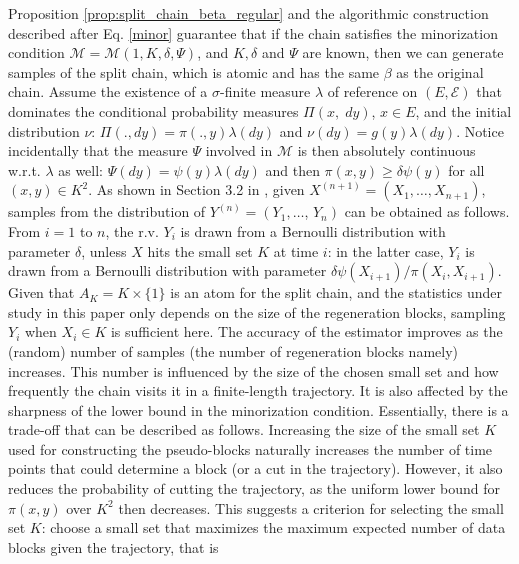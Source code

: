 \documentclass[sn-mathphys-ay]{sn-jnl}%
\newcommand{\smallSet}{K}
\begin{document}
\begin{appendices}
Proposition \ref{prop:split_chain_beta_regular} and the algorithmic construction
described after Eq. \eqref{minor} guarantee that if the chain satisfies the
minorization condition $\mathcal{M}=\mathcal{M}(1,K,\delta,\Psi)$, and $K,\delta$ and
$\Psi$ are known, then we can generate samples of the split chain, which is atomic
and has the same $\beta$ as the original chain. Assume the existence of a
$\sigma$-finite measure $\lambda$ of reference on $(E,\mathcal{E})$ that dominates
the conditional probability measures $\Pi(x,\; dy)$, $x\in E$, and the initial
distribution $\nu$: $\Pi(.,dy)=\pi(.,y)\lambda(dy)$ and $\nu(dy)=g(y)\lambda(dy)$.
Notice incidentally that the measure $\Psi$ involved in $\mathcal{M}$ is then
absolutely continuous w.r.t. $\lambda$ as well: $\Psi(dy)=\psi(y)\lambda(dy)$ and
then $\pi\left(x,y\right)\geq \delta \psi\left(y\right)$ for all $(x,y)\in K^2$. As
shown in Section 3.2 in \cite{Bertail2006}, given $X^{(n+1)}=\left(X_1, \ldots,
    X_{n+1}\right)$, samples from the distribution of $Y^{(n)}=\left(Y_1, \ldots\right.$,
    $\left.Y_n\right)$ can be obtained as follows. From $i=1$ to $n$, the r.v. $Y_i$ is
drawn from a Bernoulli distribution with parameter $\delta$, unless $X$ hits the
small set $\smallSet$ at time $i$: in the latter case, $Y_i$ is drawn from a
Bernoulli distribution with parameter $\delta \psi\left(X_{i+1}\right) /
    \pi\left(X_i, X_{i+1}\right)$. Given that $A_K=K\times \{1\}$ is an atom for the
split chain, and the statistics under study in this paper only depends on the size of
the regeneration blocks, sampling $Y_i$ when $X_i\in K$ is sufficient here. The
accuracy of the estimator improves as the (random) number of samples (the number of
regeneration blocks namely) increases. This number is influenced by the size of the
chosen small set and how frequently the chain visits it in a finite-length
trajectory. It is also affected by the sharpness of the lower bound in the
minorization condition. Essentially, there is a trade-off that can be described as
follows. Increasing the size of the small set $\smallSet$ used for constructing the
pseudo-blocks naturally increases the number of time points that could determine a
block (or a cut in the trajectory). However, it also reduces the probability of
cutting the trajectory, as the uniform lower bound for $\pi(x,y)$ over $\smallSet^2$
then decreases. This suggests a criterion for selecting the small set $\smallSet$:
choose a small set that maximizes the maximum expected number of data blocks given
the trajectory, that is
\begin{equation*}

\end{equation*}
\end{appendices}
\end{document}
